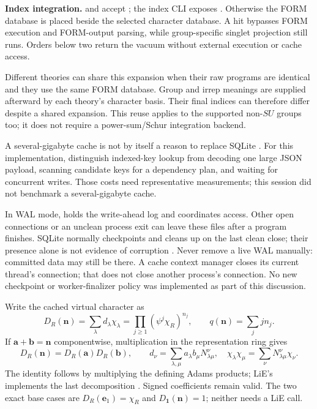\textbf{Index integration.}  and
 accept ; the
index CLI exposes . Otherwise the FORM database is
placed beside the selected character database. A hit bypasses FORM execution
and FORM-output parsing, while group-specific singlet projection still runs.
Orders below two return the vacuum without external execution or cache access.

Different theories can share this expansion when their raw programs are
identical and they use the same FORM database. Group and irrep meanings are
supplied afterward by each theory's character basis. Their final indices can
therefore differ despite a shared expansion. This reuse applies to the supported
non-$SU$ groups too; it does not require a power-sum/Schur integration backend.

A several-gigabyte cache is not by itself a reason to replace SQLite
\cite{sqlite-use}. For this implementation, distinguish indexed-key lookup
from decoding one large JSON payload, scanning candidate keys for a dependency
plan, and waiting for concurrent writes. Those costs need representative
measurements; this session did not benchmark a several-gigabyte cache.

In WAL mode,  holds the write-ahead log and  coordinates
access. Other open connections or an unclean process exit can leave these
files after a program finishes. SQLite normally checkpoints and cleans up on
the last clean close; their presence alone is not evidence of corruption
\cite{sqlite-temp}. Never remove a live WAL manually: committed data may still
be there. A cache context manager closes its current thread's connection;
that does not close another process's connection. No new checkpoint or
worker-finalizer policy was implemented as part of this discussion.

\clearpage
{}
Write the cached virtual character as
\[
 D_R(\mathbf n)=\sum_\lambda d_\lambda\chi_\lambda
   =\prod_{j\geq1}(\psi^j\chi_R)^{n_j},\qquad
 q(\mathbf n)=\sum_j j n_j.
\]
If $\mathbf a+\mathbf b=\mathbf n$ componentwise, multiplication in the
representation ring gives
\[
 D_R(\mathbf n)=D_R(\mathbf a)D_R(\mathbf b),\qquad
 d_\nu=\sum_{\lambda,\mu}
     a_\lambda b_\mu N_{\lambda\mu}^{\nu},
 \quad \chi_\lambda\chi_\mu=\sum_\nu N_{\lambda\mu}^{\nu}\chi_\nu.
\]
The identity follows by multiplying the defining Adams products; LiE's
 implements the last decomposition \cite[Sec.~4.5]{lie}.
Signed coefficients remain valid. The two exact base cases are
$D_R(\mathbf e_1)=\chi_R$ and $D_{\mathbf1}(\mathbf n)=1$;
neither needs a LiE call.

